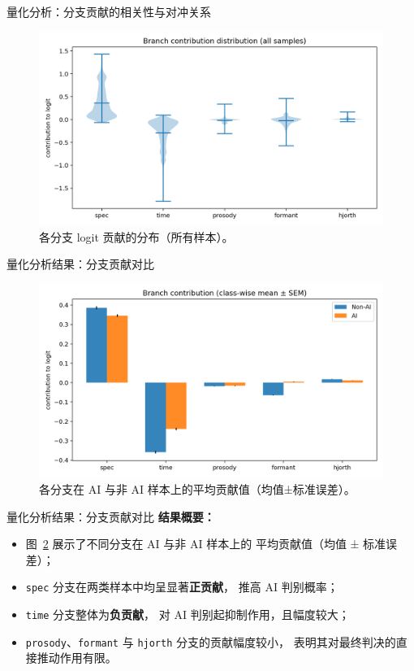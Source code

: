 \documentclass[aspectratio=169]{beamer}
\begin{document}
\begin{frame}{量化分析：分支贡献的相关性与对冲关系}
\vspace{0.6em}
\begin{figure}
  \centering
  \includegraphics[width=0.75\linewidth]{images_in_paper/contrib_violin_all.png}
  \caption{各分支 logit 贡献的分布（所有样本）。}
  \label{fig:contrib_violin}
\end{figure}

\end{frame}

\begin{frame}{量化分析结果：分支贡献对比}
\begin{figure}
  \centering
  \includegraphics[width=0.7\linewidth]{images_in_paper/contrib_means_by_class.png}
  \caption{各分支在 AI 与非 AI 样本上的平均贡献值（均值±标准误差）。}
  \label{fig:contrib_means}
\end{figure}
\end{frame}

\begin{frame}{量化分析结果：分支贡献对比}
\textbf{结果概要：}
\begin{itemize}
  \item 图~\ref{fig:contrib_means} 展示了不同分支在 AI 与非 AI 样本上的
        平均贡献值（均值 ± 标准误差）；
  \item \texttt{spec} 分支在两类样本中均呈显著\textbf{正贡献}，
        推高 AI 判别概率；
  \item \texttt{time} 分支整体为\textbf{负贡献}，
        对 AI 判别起抑制作用，且幅度较大；
  \item \texttt{prosody}、\texttt{formant} 与 \texttt{hjorth} 分支的贡献幅度较小，
        表明其对最终判决的直接推动作用有限。
\end{itemize}

\end{frame}
\end{document}
